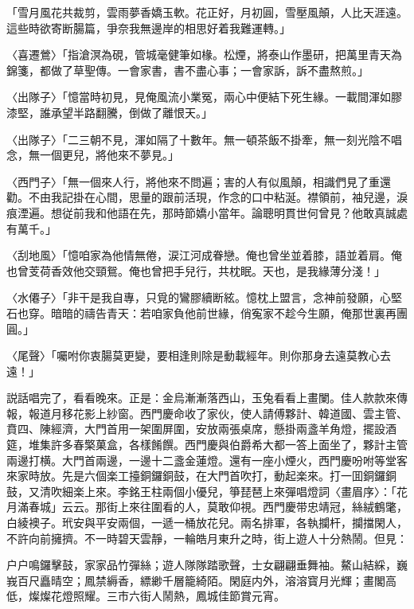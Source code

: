 \begin{myquote}
「雪月風花共裁剪，雲雨夢香嬌玉軟。花正好，月初圓，雪壓風顛，人比天涯遠。這些時欲寄断腸篇，爭奈我無邊岸的相思好着我難運轉。」

{\markfont〈喜遷鶯〉}「指滄溟為硯，管城毫健筆如椽。松煙，將泰山作墨研，把萬里青天為錦箋，都做了草聖傳。一會家書，書不盡心事；一會家訴，訴不盡熬煎。」

{\markfont〈出隊子〉}「憶當時初見，見俺風流小業冤，兩心中便結下死生緣。一載間渾如膠漆堅，誰承望半路翻騰，倒做了離恨天。」

{\markfont〈出隊子〉}「二三朝不見，渾如隔了十數年。無一頓茶飯不掛牽，無一刻光陰不唱念，無一個更兒，將他來不夢見。」

{\markfont〈西門子〉}「無一個來人行，將他來不問遍；害的人有似風顛，相識們見了重還勸。不由我記掛在心間，思量的跟前活現，作念的口中粘涎。襟領前，袖兒邊，淚痕湮遍。想従前我和他語在先，那時節嬌小當年。論聰明貫世何曾見？他敢真誠處有萬千。」

{\markfont〈刮地風〉}「憶咱家為他情無倦，涙江河成眷戀。俺也曾坐並着膝，語並着肩。俺也曾芰荷香效他交頸鴛。俺也曾把手兒行，共枕眠。天也，是我緣薄分淺！」

{\markfont〈水僊子〉}「非干是我自專，只覓的鸞膠續断絃。憶枕上盟言，念神前發願，心堅石也穿。暗暗的禱告青天：若咱家負他前世緣，俏寃家不趁今生願，俺那世裏再團圓。」

{\markfont〈尾聲〉}「囑咐你衷腸莫更變，要相逢則除是動載經年。則你那身去遠莫教心去遠！」
\end{myquote}

説話唱完了，看看晚來。正是：金烏漸漸落西山，玉兔看看上畫闌。佳人款款來傳報，報道月移花影上紗窗。西門慶命收了家伙，使人請傅夥計、韓道國、雲主管、賁四、陳經濟，大門首用一架圍屏圍，安放兩張桌席，懸掛兩盞羊角燈，擺設酒筵，堆集許多春檠菓盒，各樣餚饌。西門慶與伯爵希大都一答上面坐了，夥計主管兩邊打横。大門首兩邊，一邊十二盞金蓮燈。還有一座小煙火，西門慶吩咐等堂客來家時放。先是六個楽工擡銅鑼銅鼓，在大門首吹打，動起楽來。打一囬銅鑼銅鼓，又清吹細楽上來。李銘王柱兩個小優兒，箏琵琶上來彈唱燈詞〈畫眉序〉：「花月滿春城」云云。那街上來往圍看的人，莫敢仰視。西門慶带忠靖冠，絲絨鶴氅，白綾襖子。玳安與平安兩個，一遞一桶放花兒。兩名排軍，各執攔杆，攔擋閑人，不許向前擁擠。不一時碧天雲靜，一輪皓月東升之時，街上遊人十分熱鬧。但見：

\begin{myquote}
户户鳴鑼擊鼓，家家品竹彈絲；遊人隊隊踏歌聲，士女翩翩垂舞袖。鰲山結綵，巍峩百尺矗晴空；鳳禁縟香，縹緲千層籠綺陌。閑庭内外，溶溶寳月光輝；畫閣高低，燦燦花燈照耀。三市六街人鬧熱，鳳城佳節賞元宵。
\end{myquote}

